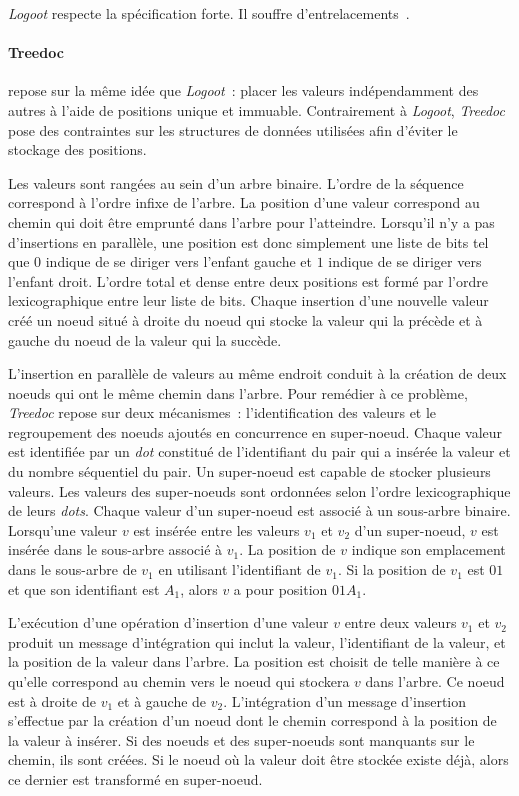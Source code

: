 \emph{Logoot} respecte la spécification forte.
Il souffre d'entrelacements~\autocite{kleppmann2019_interleaving}.


\paragraph{Treedoc}\autocite{preguica_2009_treedoc} repose sur la même idée que \emph{Logoot}~: placer les valeurs indépendamment des autres à l'aide de positions unique et immuable.
Contrairement à \emph{Logoot}, \emph{Treedoc} pose des contraintes sur les structures de données utilisées afin d'éviter le stockage des positions.

Les valeurs sont rangées au sein d'un arbre binaire.
L'ordre de la séquence correspond à l'ordre infixe de l'arbre.
La position d'une valeur correspond au chemin qui doit être emprunté dans l'arbre pour l'atteindre.
Lorsqu'il n'y a pas d'insertions en parallèle, une position est donc simplement une liste de bits tel que $0$ indique de se diriger vers l'enfant gauche et $1$ indique de se diriger vers l'enfant droit.
L'ordre total et dense entre deux positions est formé par l'ordre lexicographique entre leur liste de bits.
Chaque insertion d'une nouvelle valeur créé un noeud situé à droite du noeud qui stocke la valeur qui la précède et à gauche du noeud de la valeur qui la succède.

L'insertion en parallèle de valeurs au même endroit conduit à la création de deux noeuds qui ont le même chemin dans l'arbre.
Pour remédier à ce problème, \emph{Treedoc} repose sur deux mécanismes~: l'identification des valeurs et le regroupement des noeuds ajoutés en concurrence en super-noeud.
Chaque valeur est identifiée par un \emph{dot} constitué de l'identifiant du pair qui a insérée la valeur et du nombre séquentiel du pair.
Un super-noeud est capable de stocker plusieurs valeurs.
Les valeurs des super-noeuds sont ordonnées selon l'ordre lexicographique de leurs \emph{dots}.
Chaque valeur d'un super-noeud est associé à un sous-arbre binaire.
Lorsqu'une valeur $v$ est insérée entre les valeurs $v_1$ et $v_2$ d'un super-noeud, $v$ est insérée dans le sous-arbre associé à $v_1$.
La position de $v$ indique son emplacement dans le sous-arbre de $v_1$ en utilisant l'identifiant de $v_1$.
Si la position de $v_1$ est $01$ et que son identifiant est $A_1$, alors $v$ a pour position $01A_1$.

L'exécution d'une opération d'insertion d'une valeur $v$ entre deux valeurs $v_1$ et $v_2$ produit un message d'intégration qui inclut la valeur, l'identifiant de la valeur, et la position de la valeur dans l'arbre.
La position est choisit de telle manière à ce qu'elle correspond au chemin vers le noeud qui stockera $v$ dans l'arbre.
Ce noeud est à droite de $v_1$ et à gauche de $v_2$.
L'intégration d'un message d'insertion s'effectue par la création d'un noeud dont le chemin correspond à la position de la valeur à insérer.
Si des noeuds et des super-noeuds sont manquants sur le chemin, ils sont créées.
Si le noeud où la valeur doit être stockée existe déjà, alors ce dernier est transformé en super-noeud.

